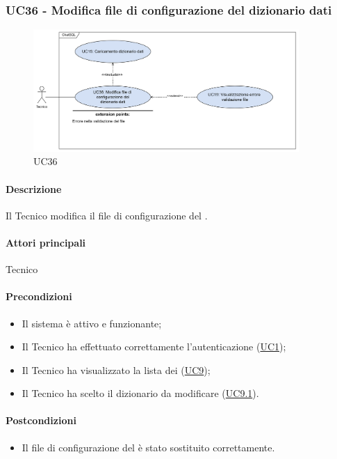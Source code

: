 \subsubsection{UC36 - Modifica file di configurazione del dizionario dati}\label{UC36}

\begin{figure}[H]
  \centering
  \includegraphics[width=0.90\textwidth]{assets/uc36.png}
  \caption{UC36}
\end{figure}

\paragraph*{Descrizione}
Il Tecnico modifica il file di configurazione del . 

\paragraph*{Attori principali}
Tecnico

\paragraph*{Precondizioni}
\begin{itemize}
  \item Il sistema è attivo e funzionante;
  \item Il Tecnico ha effettuato correttamente l'autenticazione (\hyperref[UC1]{UC1});
  \item Il Tecnico ha visualizzato la lista dei  (\hyperref[UC9]{UC9});
  \item Il Tecnico ha scelto il dizionario da modificare (\hyperref[UC9.1]{UC9.1}).
\end{itemize}

\paragraph*{Postcondizioni}
\begin{itemize}
  \item Il file di configurazione del  è stato sostituito correttamente.
\end{itemize}

